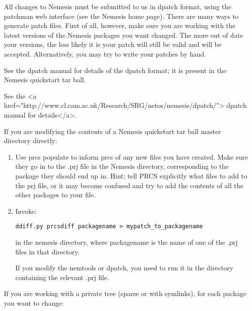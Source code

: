 \documentclass[a4paper]{article}
\begin{document}
All changes to Nemesis must be submitted to us in dpatch format, using
the patchman web interface (see the Nemesis home page). There are many
ways to generate patch files.  First of all, however, make sure you
are working with the latest versions of the Nemesis packages you want
changed. The more out of date your versions, the less likely it is
your patch will still be valid and will be accepted. Alternatively,
you may try to write your patches by hand. 
\begin{latexonly}
See the dpatch manual for details of the dpatch format; it is present in the
Nemesis quickstart tar ball.
\end{latexonly}
\begin{htmlonly}
\begin{rawhtml}
See the <a
href="http://www.cl.cam.ac.uk/Research/SRG/netos/nemesis/dpatch/">
dpatch manual for details</a>.
\end{rawhtml}
\end{htmlonly}

If you are modifying the contents of a Nemesis quickstart tar ball
master directory directly:

\begin{enumerate}

\item Use prcs populate to inform prcs of any new files you have
created. Make sure they go in to the .prj file in the Nemesis
directory, corresponding to the package they should end up in. Hint;
tell PRCS explicitly what files to add to the prj file, or it may
become confused and try to add the contents of all the other packages
to your file.

\item Invoke:
\begin{verbatim}
ddiff.py prcsdiff packagename > mypatch_to_packagename
\end{verbatim}

in the nemesis directory, where packagename is the name of one of the
.prj files in that directory.

If you modify the nemtools or dpatch, you need to run it in the
directory containing the relevant .prj file.

\end{enumerate}

If you are working with a private tree (sparse or with symlinks), for
each package you want to change:
\end{document}
